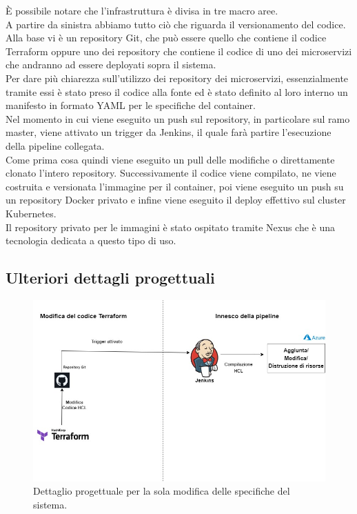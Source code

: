 \documentclass[a4paper,12pt]{report}
\begin{document}
È possibile notare che l'infrastruttura è divisa in tre macro aree.\\
A partire da sinistra abbiamo tutto ciò che riguarda il versionamento del codice. Alla base vi è un repository Git, che può essere quello che contiene il codice Terraform oppure uno dei repository che contiene il codice di uno dei microservizi che andranno ad essere deployati sopra il sistema.\\
Per dare più chiarezza sull'utilizzo dei repository dei microservizi, essenzialmente tramite essi è stato preso il codice alla fonte ed è stato definito al loro interno un manifesto in formato YAML per le specifiche del container.\\
Nel momento in cui viene eseguito un push sul repository, in particolare sul ramo master, viene attivato un trigger da Jenkins, il quale farà partire l'esecuzione della pipeline collegata.\\
Come prima cosa quindi viene eseguito un pull delle modifiche o direttamente clonato l'intero repository. Successivamente il codice viene compilato, ne viene costruita e versionata l'immagine per il container, poi viene eseguito un push su un repository Docker privato e infine viene eseguito il deploy effettivo sul cluster Kubernetes.\\
Il repository privato per le immagini è stato ospitato tramite Nexus che è una tecnologia dedicata a questo tipo di uso.
\subsection{Ulteriori dettagli progettuali}

\begin{figure}[h]
	\includegraphics[width=1.0\textwidth]{modifica_terraform}
    \caption{Dettaglio progettuale per la sola modifica delle specifiche del sistema.}
    \label{fig:modifica_terraform}
\end{figure}
\end{document}
